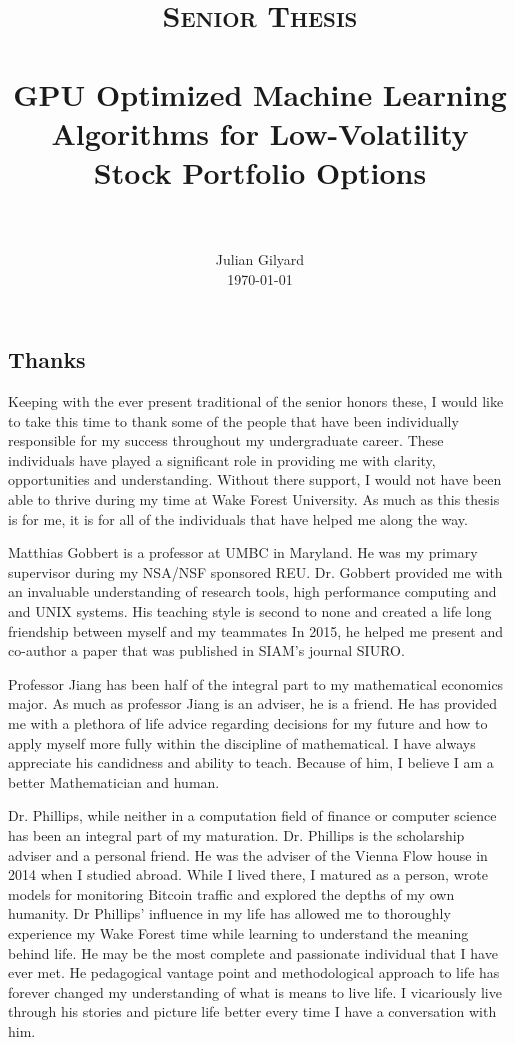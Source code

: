 \documentclass[paper=letter, fontsize=11pt]{scrartcl}
\title{
		\usefont{OT1}{bch}{b}{n}
		\normalfont \normalsize \textsc{Senior Thesis} \\ [25pt]
		\horrule{0.5pt} \\[0.4cm]
		\huge GPU Optimized Machine Learning Algorithms for Low-Volatility Stock Portfolio Options \\
		\horrule{2pt} \\[0.5cm]
}
\author{
	\normalfont \normalsize
        Julian Gilyard\\[-3pt]		
	\normalsize
        \today
}
\date{}
\numberwithin{equation}{section}		%
\numberwithin{figure}{section}			%
\numberwithin{table}{section}				%
\begin{document}

\maketitle

\tableofcontents

\begin{spacing}{2}
\section*{Thanks}
Keeping with the ever present traditional of the senior honors these, I would like to take this time to thank some of the people that have been individually responsible for my success throughout my undergraduate career. These individuals have played a significant role in  providing me with clarity, opportunities and understanding. Without there support, I would not have been able to thrive during my time at Wake Forest University. As much as this thesis is for me, it is for all of the individuals that have helped me along the way. 

Matthias Gobbert is a professor at UMBC in Maryland. He was my primary supervisor during my NSA/NSF sponsored REU. Dr. Gobbert provided me with an invaluable understanding of research tools, high performance computing and and UNIX systems. His teaching style is second to none and created a life long friendship between myself and my teammates In 2015, he helped me present and co-author a paper that was published in SIAM's journal SIURO. 

Professor Jiang has been half of the integral part to my mathematical economics major. As much as professor Jiang is an adviser, he is a friend. He has provided me with a plethora of life advice regarding decisions for my future and how to apply myself more fully within the discipline of mathematical. I have always appreciate his candidness and ability to teach. Because of him, I believe I am a better Mathematician and human. 

Dr. Phillips, while neither in a computation field of finance or computer science has been an integral part of my maturation. Dr. Phillips is the scholarship adviser and a personal friend. He was the adviser of the Vienna Flow house in 2014 when I studied abroad. While I lived there, I matured as a person, wrote models for monitoring Bitcoin traffic and explored the depths of my own humanity. Dr Phillips' influence in my life has allowed me to thoroughly experience my Wake Forest time while learning to understand the meaning behind life. He may be the most complete and passionate individual that I have ever met. He pedagogical vantage point and methodological approach to life has forever changed my understanding of what is means to live life. I vicariously live through his stories and picture life better every time I have a conversation with him.


\end{spacing}
\end{document}
